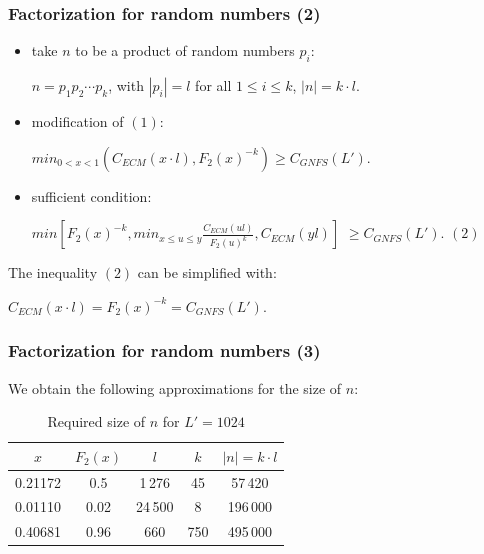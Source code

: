 \documentclass{beamer}
\begin{document}
\begin{frame}
\frametitle{Factorization for random numbers (2)}

	\begin{itemize}
		\item take $n$ to be a product of random numbers $p_i$:
		
		\hspace{10mm} $n= p_1 p_2 \cdots p_k$, with $|p_i| =l$ for all $1 \leq i \leq k$, $|n| = k \cdot l$. 
		
		\item modification of $(1)$: 
		
		\hspace{30mm} $min_{0 < x < 1}(C_{ECM}(x \cdot l), F_2(x)^{-k}) \geq C_{GNFS}(L')$.
		
		\item sufficient condition:
		
		$min [F_2(x)^{-k}, min_{x \leq u \leq y} \frac{C_{ECM}(ul)}{F_2(u)^k}, C_{ECM}(yl)]$ $\geq C_{GNFS}(L').$ \quad  $(2)$ 
		
	\end{itemize}	
	
	
	
	\bigskip
	
	The inequality $(2)$ can be simplified with:
	
	\hspace{30mm} $C_{ECM}(x \cdot l) = F_2(x)^{-k} = C_{GNFS}(L')$. 
	
			
\end{frame}


\begin{frame}
\frametitle{Factorization for random numbers (3)}

	We obtain the following approximations for the size of $n$:
	
	
		  	\begin{table}
	 		\begin{center}
	 		
	 		\begin{tabular}{ | c | c | c | c | c |}
	 		
	 		\hline
	 		  $x$  & $F_2(x)$ & $l$ & $k$ & $|n| = k \cdot l$ \\
	 		\hline
	 		0.21172 & 0.5 &  1$\,$276 & 45 &  57\,420 \\
	 		\hline
	 		0.01110 & 0.02 & 24\,500& 8  & 196\,000 \\
	 		\hline
	 		0.40681 & 0.96 & 660 & 750 & 495\,000 \\
	 		\hline 
	 		
	 		\end{tabular}
	 		\label{table2}
	 		\caption{Required size of $n$ for $L'= 1024$}  
	 		\end{center}
	 		\end{table}
	 		

\end{frame}
\end{document}
